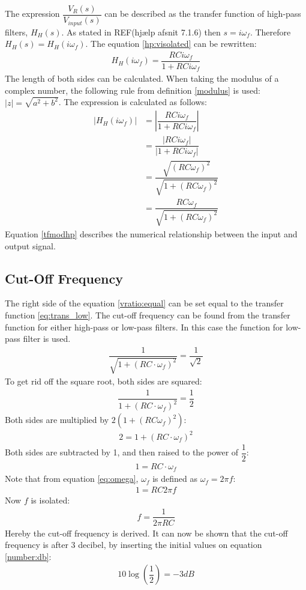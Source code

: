 The expression $\dfrac{V_{R}(s)}{V_{input}(s)}$ can be described as the transfer function of high-pass filters, $H_{H}(s)$. As stated in REF(hjælp afsnit 7.1.6) then $s=i \omega_f$. Therefore $H_{H}(s)=H_{H}(i \omega_f)$. The equation \eqref{hp:visolated} can be rewritten:
\begin{align*}
H_{H}(i \omega_f) = \dfrac{RCi \omega_f}{1 + RCi \omega_f}
\end{align*}
The length of both sides can be calculated. When taking the modulus of a complex number, the following rule from definition \ref{modulus} is used: $|z|= \sqrt{a^2+b^2}$. The expression is calculated as follows:
\begin{align}
\left|H_{H}(i \omega_f)\right| &= \left|\dfrac{RCi \omega_f}{1 + RCi \omega_f} \right| \\
 &= \dfrac{|RCi \omega_f|}{|1 + RCi \omega_f |} \\
 &= \dfrac{\sqrt{(RC \omega_f)^2}}{\sqrt{1 + (RC \omega_f)^2 }} \\
 &= \dfrac{RC \omega_f}{\sqrt{1 + (RC \omega_f)^2 }} \label{tfmodhp}
\end{align} 
Equation \eqref{tfmodhp} describes the numerical relationship between the input and output signal.
\subsection{Cut-Off Frequency}
The right side of the equation \eqref{vratio:equal} can be set equal to the transfer function \ref{eq:trans_low}. The cut-off frequency can be found from the transfer function for either high-pass or low-pass filters. In this case the function for low-pass filter is used.
\\
\begin{align*}
\dfrac{1}{\sqrt{1+ \left(RC \cdot \omega_f \right)^2}} = \dfrac{1}{\sqrt{2}}
\end{align*}
To get rid off the square root, both sides are squared:
\begin{align*}
\dfrac{1}{1+ \left(RC \cdot \omega_f \right)^2} = \dfrac{1}{2}
\end{align*}
	Both sides are multiplied by $2(1+(RC\omega_f)^2)$:
\begin{align*}
2 = 1+ \left(RC \cdot \omega_f \right)^2
\end{align*}
Both sides are subtracted by 1, and then raised to the power of $\dfrac{1}{2}$:
\begin{align*}
1 = RC \cdot \omega_f 
\end{align*}
Note that from equation \eqref{eq:omega}, $\omega_f$ is defined as $\omega_f=2 \pi f$:
\begin{align*}
1 = RC 2\pi f 
\end{align*}
Now $f$ is isolated:
\begin{align*}
f=\dfrac{1}{2\pi RC}
\end{align*}
Hereby the cut-off frequency is derived. It can now be shown that the cut-off frequency is after 3 decibel, by inserting the initial values on equation \eqref{number:db}:
\begin{align*}
10 \log \left(\dfrac{1}{2} \right) = -3 dB
\end{align*}
